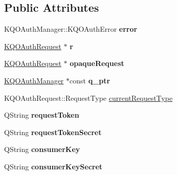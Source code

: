 \subsection*{Public Attributes}
\begin{DoxyCompactItemize}
\item 
\mbox{\label{class_k_q_o_auth_manager_private_a529bfb4f5e2959c18bdeb65998c6ba0c}} 
K\+Q\+O\+Auth\+Manager\+::\+K\+Q\+O\+Auth\+Error {\bfseries error}
\item 
\mbox{\label{class_k_q_o_auth_manager_private_a4c356a156682d30ee50b7d7e55958156}} 
\hyperlink{class_k_q_o_auth_request}{K\+Q\+O\+Auth\+Request} $\ast$ {\bfseries r}
\item 
\mbox{\label{class_k_q_o_auth_manager_private_a055b93e5b33e590f9a37faeae97d18d2}} 
\hyperlink{class_k_q_o_auth_request}{K\+Q\+O\+Auth\+Request} $\ast$ {\bfseries opaque\+Request}
\item 
\mbox{\label{class_k_q_o_auth_manager_private_a9faf47c68d2411c436ce3e754253c37a}} 
\hyperlink{class_k_q_o_auth_manager}{K\+Q\+O\+Auth\+Manager} $\ast$const {\bfseries q\+\_\+ptr}
\item 
K\+Q\+O\+Auth\+Request\+::\+Request\+Type \hyperlink{class_k_q_o_auth_manager_private_a2f70ace00de205f3d1f1bf79d1987bb0}{current\+Request\+Type}
\item 
\mbox{\label{class_k_q_o_auth_manager_private_a39148cfe5836232a85b03edf5bd2b683}} 
Q\+String {\bfseries request\+Token}
\item 
\mbox{\label{class_k_q_o_auth_manager_private_a27294f4562ef672639a44f69eb22edeb}} 
Q\+String {\bfseries request\+Token\+Secret}
\item 
\mbox{\label{class_k_q_o_auth_manager_private_aea80d73c181bb414f85f8ef2ad759aab}} 
Q\+String {\bfseries consumer\+Key}
\item 
\mbox{\label{class_k_q_o_auth_manager_private_a9df443f2445703c24f6b562259e6bd25}} 
Q\+String {\bfseries consumer\+Key\+Secret}

\end{DoxyCompactItemize}
